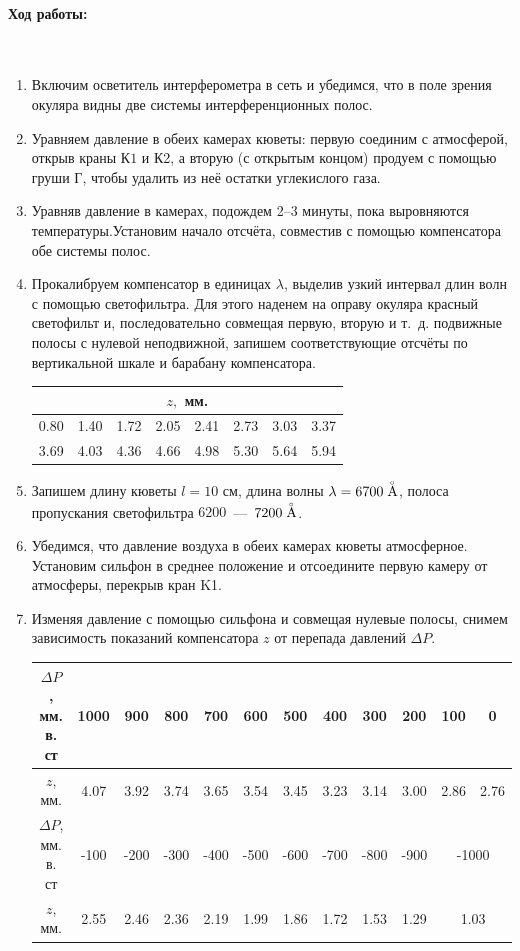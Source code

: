 \documentclass[a4paper, 12pt]{article}
\newcommand{\parag}[1]{\paragraph*{#1:}}
\begin{document}
\parag {Ход работы} ~

\begin{enumerate}
    \item Включим осветитель интерферометра в сеть и убедимся, что в поле зрения окуляра видны две системы интерференционных полос.
    \item Уравняем давление в обеих камерах кюветы: первую соединим с атмосферой, открыв краны $К1$ и К2, а вторую (с открытым концом) продуем с помощью груши Г, чтобы
    удалить из неё остатки углекислого газа.
    \item Уравняв давление в камерах, подождем 2–3 минуты, пока выровняются температуры.Установим начало отсчёта, совместив с помощью компенсатора обе системы полос.
    \item Прокалибруем компенсатор в единицах $\lambda$, выделив узкий интервал длин волн с помощью светофильтра. Для этого наденем на оправу окуляра красный светофильт и, последовательно совмещая первую, вторую и т.~д. подвижные полосы с нулевой неподвижной, запишем соответствующие отсчёты по вертикальной шкале и барабану компенсатора.
    
    \begin{tabular}{|c|c|c|c|c|c|c|c|} \hline
        \multicolumn{8}{|c|}{$z, $ мм.} \\ \hline
        0.80 & 1.40 & 1.72 & 2.05 & 2.41 & 2.73 & 3.03 & 3.37 \\ \hline
        3.69 & 4.03 & 4.36 & 4.66 & 4.98 & 5.30 & 5.64 & 5.94 \\ \hline
    \end{tabular}

    \item Запишем длину кюветы $l = 10$ см, длина волны $\lambda = 6700 \buildrel _\circ \over {\mathrm{A}}$, полоса пропускания светофильтра $6200$~---~$7200 \buildrel _\circ \over {\mathrm{A}}$.
    \item Убедимся, что давление воздуха в обеих камерах кюветы атмосферное. Установим сильфон в среднее положение и отсоедините первую камеру от атмосферы, перекрыв кран K1.
    \item Изменяя давление с помощью сильфона и совмещая нулевые полосы, снимем зависимость показаний компенсатора $z$ от перепада давлений $\Delta P$.
    
    \begin{tabular}{|c|c|c|c|c|c|c|c|c|c|c|c|} \hline
        $\Delta P$, мм. в. ст & 1000 & 900 & 800 & 700 & 600 & 500 & 400 & 300 & 200 & 100 & 0 \\ \hline
        $z$, мм. & 4.07 & 3.92 & 3.74 & 3.65 & 3.54 & 3.45 & 3.23 & 3.14 & 3.00 & 2.86 & 2.76 \\ \hline
        $\Delta P$, мм. в. ст & -100 & -200 & -300 & -400 & -500 & -600 & -700 & -800 & -900 & \multicolumn{2}{|c|}{-1000} \\ \hline
        $z$, мм. & 2.55 & 2.46 & 2.36 & 2.19 & 1.99 & 1.86 & 1.72 & 1.53 & 1.29 & \multicolumn{2}{|c|}{1.03} \\ \hline
    \end{tabular}


\end{enumerate}
\end{document}
